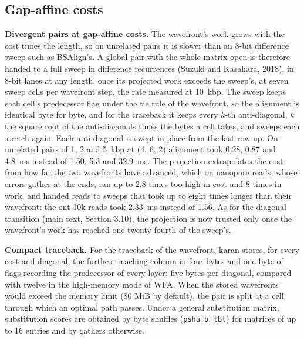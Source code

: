 \documentclass[10pt]{article}
\begin{document}
\subsection{Gap-affine costs}

\textbf{Divergent pairs at gap-affine costs.} The wavefront's work grows with the cost times the length, so on unrelated pairs it is slower than an 8-bit difference sweep such as BSAlign's. A global pair with the whole matrix open is therefore handed to a full sweep in difference recurrences (Suzuki and Kasahara, 2018), in 8-bit lanes at any length, once its projected work exceeds the sweep's, at seven sweep cells per wavefront step, the rate measured at 10~kbp. The sweep keeps each cell's predecessor flag under the tie rule of the wavefront, so the alignment is identical byte for byte, and for the traceback it keeps every \(k\)-th anti-diagonal, \(k\) the square root of the anti-diagonals times the bytes a cell takes, and sweeps each stretch again. Each anti-diagonal is swept in place from the last row up. On unrelated pairs of 1, 2 and 5~kbp at (4, 6, 2) alignment took 0.28, 0.87 and 4.8~ms instead of 1.50, 5.3 and 32.9~ms. The projection extrapolates the cost from how far the two wavefronts have advanced, which on nanopore reads, whose errors gather at the ends, ran up to 2.8 times too high in cost and 8 times in work, and handed reads to sweeps that took up to eight times longer than their wavefront: the ont-10k reads took 2.33~ms instead of 1.56. As for the diagonal transition (main text, Section 3.10), the projection is now trusted only once the wavefront's work has reached one twenty-fourth of the sweep's.

\textbf{Compact traceback.} For the traceback of the wavefront, karan stores, for every cost and diagonal, the furthest-reaching column in four bytes and one byte of flags recording the predecessor of every layer: five bytes per diagonal, compared with twelve in the high-memory mode of WFA. When the stored wavefronts would exceed the memory limit (80 MiB by default), the pair is split at a cell through which an optimal path passes. Under a general substitution matrix, substitution scores are obtained by byte shuffles (\texttt{pshufb}, \texttt{tbl}) for matrices of up to 16 entries and by gathers otherwise.
\end{document}
